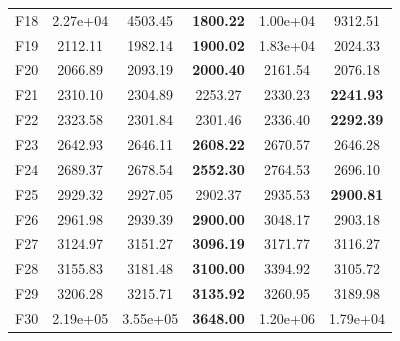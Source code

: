 \documentclass[journal]{IEEEtran}
\begin{document}
\begin{table}[t]
{\begin{tabular}{lccccc}
F18 & 2.27e+04 & 4503.45 & \textbf{1800.22} & 1.00e+04 & 9312.51 \\
F19 & 2112.11 & 1982.14 & \textbf{1900.02} & 1.83e+04 & 2024.33 \\
F20 & 2066.89 & 2093.19 & \textbf{2000.40} & 2161.54 & 2076.18 \\
F21 & 2310.10 & 2304.89 & 2253.27 & 2330.23 & \textbf{2241.93} \\
F22 & 2323.58 & 2301.84 & 2301.46 & 2336.40 & \textbf{2292.39} \\
F23 & 2642.93 & 2646.11 & \textbf{2608.22} & 2670.57 & 2646.28 \\
F24 & 2689.37 & 2678.54 & \textbf{2552.30} & 2764.53 & 2696.10 \\
F25 & 2929.32 & 2927.05 & 2902.37 & 2935.53 & \textbf{2900.81} \\
F26 & 2961.98 & 2939.39 & \textbf{2900.00} & 3048.17 & 2903.18 \\
F27 & 3124.97 & 3151.27 & \textbf{3096.19} & 3171.77 & 3116.27 \\
F28 & 3155.83 & 3181.48 & \textbf{3100.00} & 3394.92 & 3105.72 \\
F29 & 3206.28 & 3215.71 & \textbf{3135.92} & 3260.95 & 3189.98 \\
F30 & 2.19e+05 & 3.55e+05 & \textbf{3648.00} & 1.20e+06 & 1.79e+04 \\
\bottomrule
\end{tabular}}
\end{table}
\end{document}
